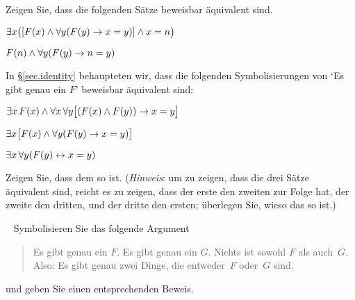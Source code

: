 \problempart
Zeigen Sie, dass die folgenden Sätze beweisbar äquivalent sind.
\begin{ebullet}
\item $\exists x \bigl([\mathord{F}(x) \wedge \forall y (\mathord{F}(y) \rightarrow x = y)] \wedge x = n\bigr)$
\item $\mathord{F}(n) \wedge \forall y (\mathord{F}(y) \rightarrow n= y)$
\end{ebullet}

\problempart
In \S\ref{sec.identity} behaupteten wir, dass die folgenden Symbolisierungen von `Es gibt genau ein $F$' beweisbar äquivalent sind:
\begin{ebullet}
\item $\exists x\,\mathord{F}(x) \wedge \forall x\, \forall y \bigl[(\mathord{F}(x) \wedge \mathord{F}(y)) \rightarrow x = y\bigr]$
\item $\exists x \bigl[\mathord{F}(x) \wedge \forall y (\mathord{F}(y) \rightarrow x = y)\bigr]$
\item $\exists x\, \forall y (\mathord{F}(y) \leftrightarrow x = y)$
\end{ebullet}
Zeigen Sie, dass dem so ist. (\emph{Hinweis}: um zu zeigen, dass die drei Sätze äquivalent sind, reicht es zu zeigen, dass der erste den zweiten zur Folge hat, der zweite den dritten, und der dritte den ersten; überlegen Sie, wieso das so ist.)


\
\problempart
Symbolisieren Sie das folgende Argument
	\begin{quote}
		Es gibt genau ein $F$. Es gibt genau ein $G$. Nichts ist sowohl $F$ als auch~$G$. Also: Es gibt genau zwei Dinge, die entweder~$F$ oder~$G$ sind.
	\end{quote}
und geben Sie einen entsprechenden Beweis.

